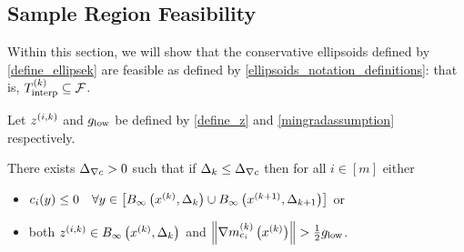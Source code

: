 \subsection{Sample Region Feasibility}
\label{ellipsoid_is_feasible_section}

Within this section, we will show that the conservative ellipsoids defined by \cref{define_ellipsek} are feasible as defined by \cref{ellipsoids_notation_definitions}:
that is, ${T_{\text{interp}}^{(k)}} \subseteq {\mathcal F}$.

\begin{lemma}
\label{only_small_z_matters}
Let ${z^{(i, k)}}$ and ${ g_{\textrm{low}} }$ be defined by \cref{define_z} and \cref{mingradassumption} respectively.



There exists ${\Delta_{\nabla c}} > 0$ such that if $\Delta_k \le {\Delta_{\nabla c}}$ then for all $i \in [m]$ either
\begin{itemize}
\item $c_i(y) \le 0 \quad \forall y \in \left[{ B_{\infty}\left(x^{(k)}, \Delta_k\right) } \cup { B_{\infty}\left({{x}^{(k+1)}}, \Delta_{k+1}\right) }\right]$ or
\item both ${z^{(i, k)}} \in { B_{\infty}\left(x^{(k)}, \Delta_k\right) }$ and $\left\|{\nabla m_{c_i}^{(k)}\left(x^{(k)}\right)}\right\| > \frac 1 2 { g_{\textrm{low}} }$.
\end{itemize}
\end{lemma}
